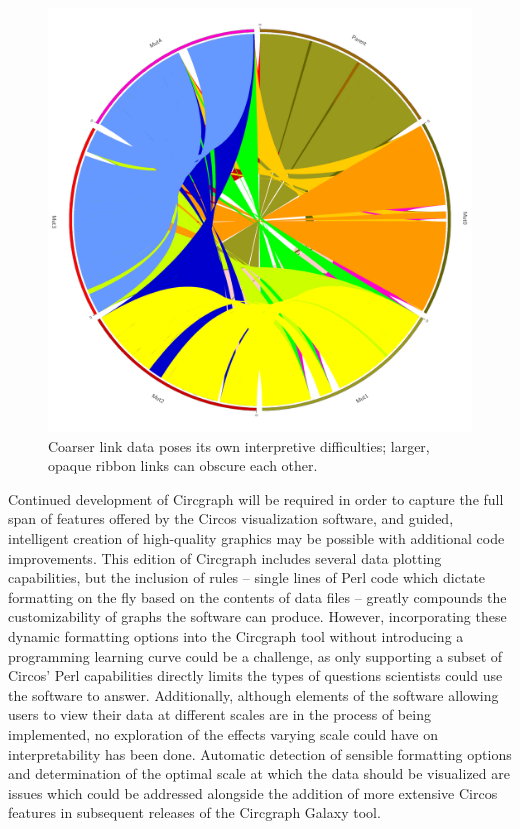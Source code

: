 \documentclass[twocolumn]{article}
\begin{document}
\begin{figure}
\centering
\includegraphics[scale=0.1]{./Generated_Color_Fixes.png}
\caption{Coarser link data poses its own interpretive difficulties; larger, opaque ribbon links can obscure each other.}
\end{figure}

Continued development of Circgraph will be required in order to capture the full span of features offered by the Circos visualization software, and guided, intelligent creation of high-quality graphics may be possible with additional code improvements. This edition of Circgraph includes several data plotting capabilities, but the inclusion of rules -- single lines of Perl code which dictate formatting on the fly based on the contents of data files -- greatly compounds the customizability of graphs the software can produce. However, incorporating these dynamic formatting options into the Circgraph tool without introducing a programming learning curve could be a challenge, as only supporting a subset of Circos' Perl capabilities directly limits the types of questions scientists could use the software to answer. Additionally, although elements of the software allowing users to view their data at different scales are in the process of being implemented, no exploration of the effects varying scale could have on interpretability has been done. Automatic detection of sensible formatting options and determination of the optimal scale at which the data should be visualized are issues which could be addressed alongside the addition of more extensive Circos features in subsequent releases of the Circgraph Galaxy tool.

\printbibliography
\end{document}

